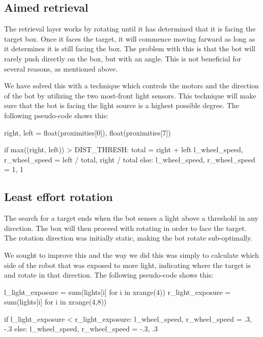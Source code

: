 \documentclass[a4paper,10pt]{article}
\begin{document}
\subsection{Aimed retrieval}

The retrieval layer works by rotating until it has determined that it is 
facing the target box. Once it faces the target, it will commence moving 
farward as long as it determines it is still facing the box. The problem with 
this is that the bot will rarely push directly on the box, but with an angle.  
This is not beneficial for several reasons, as mentioned above.

We have solved this with a technique which controls the motors and the 
direction of the bot by utilizing the two most-front light sensors. This 
technique will make sure that the bot is facing the light source is a highest 
possible degree. The following pseudo-code shows this:

\begin{python}
right, left = float(proximities[0]), float(proximities[7])

if max((right, left)) > DIST_THRESH:
    total = right + left
    l_wheel_speed, r_wheel_speed = left / total, right / total
else:
    l_wheel_speed, r_wheel_speed = 1, 1
\end{python}

\subsection{Least effort rotation}

The search for a target ends when the bot senses a light above a threshold in 
any direction. The box will then proceed with rotating in order to face the 
target. The rotation direction was initially static, making the bot rotate 
sub-optimally.

We sought to improve this and the way we did this was simply to calculate 
which side of the robot that was exposed to more light, indicating where the 
target is and rotate in that direction. The following pseudo-code shows this:

\begin{python}
l_light_exposure = sum(lights[i] for i in xrange(4))
r_light_exposure = sum(lights[i] for i in xrange(4,8))

if l_light_exposure < r_light_exposure:
    l_wheel_speed, r_wheel_speed = .3, -.3
else:
    l_wheel_speed, r_wheel_speed = -.3, .3
\end{python}
\end{document}
